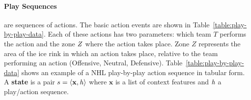 \documentclass[runningheads,a4paper]{llncs}
\def\set#1{\mathbf{#1}}
\newcommand{\mstate}{s}
\newcommand{\mfeatures}{\set{x}}
\newcommand{\action}{a}
\newcommand{\zone}{\it{Z}}
\newcommand{\team}{T}
\newcommand{\neutral}{\it{Neutral}}
\newcommand{\history}{\it{h}}
\begin{document}
\paragraph{Play Sequences} are sequences of actions.
\label{subsec:play-sequences}
The basic action events are shown in Table~\ref{table:play-by-play-data}. 
Each of these actions has two parameters: which team $T$ performs the action and the zone $\zone$ where the action takes place. Zone $Z$ represents the area of the ice rink in which an action takes place, relative to the team performing an action
(Offensive, Neutral, Defensive). 
Table~\ref{table:play-by-play-data} shows an example of a NHL play-by-play action sequence in tabular form. %
%
%
A \textbf{state} is a pair $\mstate = \langle \mfeatures, \history \rangle$ where $\mfeatures$ is a list of context features and $\history$ a play/action sequence. %
\end{document}
